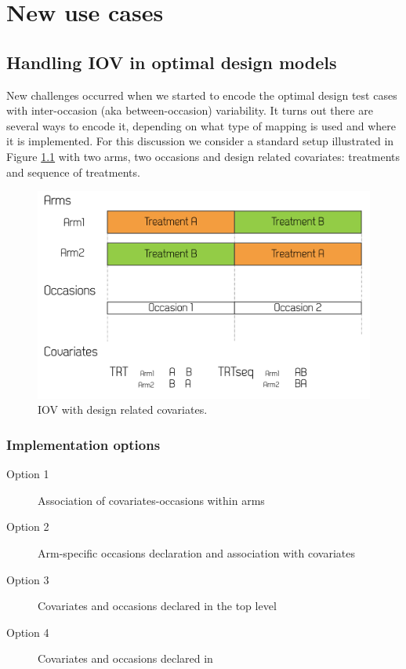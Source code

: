 
\chapter{New use cases}
\label{ch:newCases}


\section{Handling IOV in optimal design models}
\label{sec:IOVinODE}
New challenges occurred when we started to encode the optimal design 
test cases with inter-occasion (aka between-occasion) variability. It turns out
there are several ways to encode it, depending on what type of mapping is 
used and where it is implemented. For this discussion we consider a standard
setup illustrated in Figure \ref{fig:IOVdesign} with two arms, two occasions and design 
related covariates: treatments and sequence of treatments.

\begin{figure}[htb]
\centering
  \includegraphics[width=140mm]{pics/IOVexample}
  \caption{IOV with design related covariates.}
  \label{fig:IOVdesign}
\end{figure}


\subsection{Implementation options}
\begin{description}
\item[Option 1] Association of covariates-occasions within arms
\item[Option 2] Arm-specific occasions declaration and association with covariates
\item[Option 3] Covariates and occasions declared in the top level
\item[Option 4] Covariates and occasions declared in 
\end{description}



